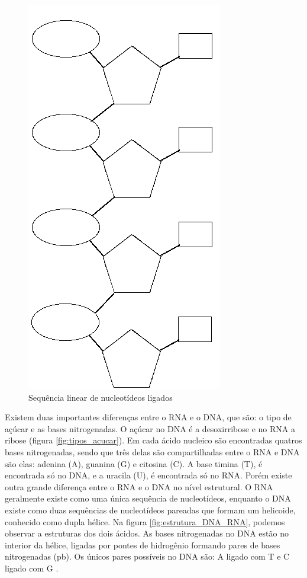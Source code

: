\begin{figure}[htb!]
    \centering
    \includegraphics[scale=0.5]{./imagens/sequencia_nucleotideo.png}
    \caption{Sequência linear de nucleotídeos ligados}
    \label{fig:sequencia_nucleotideo}
\end{figure}

Existem duas importantes diferenças entre o RNA e o DNA, que são: o tipo de açúcar e as bases nitrogenadas. O açúcar no DNA é a desoxirribose e no RNA a ribose (figura \ref{fig:tipos_acucar}). Em cada ácido nucleico são encontradas quatros bases nitrogenadas, sendo que três delas são compartilhadas entre o RNA e DNA são elas: adenina (A), guanina (G) e citosina (C). A base timina (T), é encontrada só no DNA, e a uracila (U), é encontrada só no RNA. Porém existe outra grande diferença entre o RNA e o DNA no nível estrutural. O RNA geralmente existe como uma única sequência de nucleotídeos, enquanto o DNA existe como duas sequências de nucleotídeos pareadas que formam um helicoide, conhecido como dupla hélice. Na figura \ref{fig:estrutura_DNA_RNA}, podemos observar a estruturas dos dois ácidos. As bases nitrogenadas no DNA estão no interior da hélice, ligadas por pontes de hidrogênio formando pares de bases nitrogenadas (pb). Os únicos pares possíveis no DNA são: A ligado com T e C ligado com G \cite{Zaha2000}.

